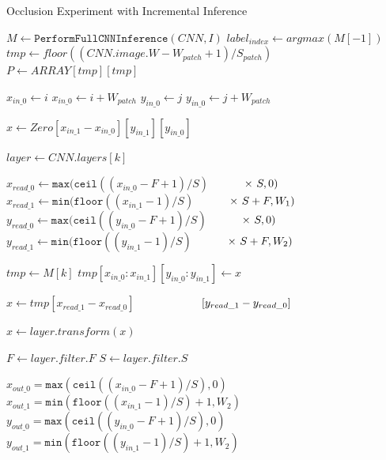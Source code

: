 \begin{algorithm}
\caption{Occlusion Experiment with Incremental Inference}\label{alg:inc-inference}
\begin{algorithmic}[1]

\State $M \gets \texttt{PerformFullCNNInference}(CNN, I)$
\State $label_{index} \gets argmax(M[-1])$
\State $tmp \gets floor((CNN.image.W-W_{patch}+1)/S_{patch})$
\State $P \gets ARRAY[tmp][tmp]$


      \State $x_{in\_0} \gets i$
      \State $x_{in\_0} \gets i + W_{patch}$
      \State $y_{in\_0} \gets j$
      \State $y_{in\_0} \gets j + W_{patch}$

      \State $x \gets Zero[x_{in\_1}-x_{in\_0}][y_{in\_1}][y_{in\_0}]$
      
          \State $layer \gets CNN.layers[k]$

            \State $x_{read\_0} \gets \texttt{max}(\texttt{ceil}((x_{in\_0} - F + 1)/S)$
            \State $\hspace{10mm} \times ~S, 0)$
            \State $x_{read\_1} \gets \texttt{min}(\texttt{floor}((x_{in\_1} - 1)/S)$
            \State $\hspace{10mm} \times ~S + F, W_1)$
            \State $y_{read\_0} \gets \texttt{max}(\texttt{ceil}((y_{in\_0} - F + 1)/S)$
            \State $\hspace{10mm} \times ~S, 0)$
            \State $y_{read\_1} \gets \texttt{min}(\texttt{floor}((y_{in\_1} - 1)/S)$
            \State $\hspace{10mm} \times ~S + F, W_2)$

            \State $tmp \gets M[k]$
            \State $tmp[x_{in\_0}:x_{in\_1}][y_{in\_0}:y_{in\_1}] \gets x$

            \State $x \gets tmp[x_{read\_1}-x_{read\_0}]$
            \State $\hspace{20mm}       [y_{read\_1}-y_{read\_0}]$

            \State $x \gets layer.transform(x)$

            \State $F \gets layer.filter.F$
            \State $S \gets layer.filter.S$
            
            \State $x_{out\_0} = \texttt{max}(\texttt{ceil}((x_{in\_0} - F + 1)/S), 0)$
            \State $x_{out\_1} = \texttt{min}(\texttt{floor}((x_{in\_1} - 1)/S) + 1, W_2)$
            \State $y_{out\_0} = \texttt{max}(\texttt{ceil}((y_{in\_0} - F + 1)/S), 0)$
            \State $y_{out\_1} = \texttt{min}(\texttt{floor}((y_{in\_1} - 1)/S) + 1, W_2)$
            

\end{algorithmic}
\end{algorithm}

